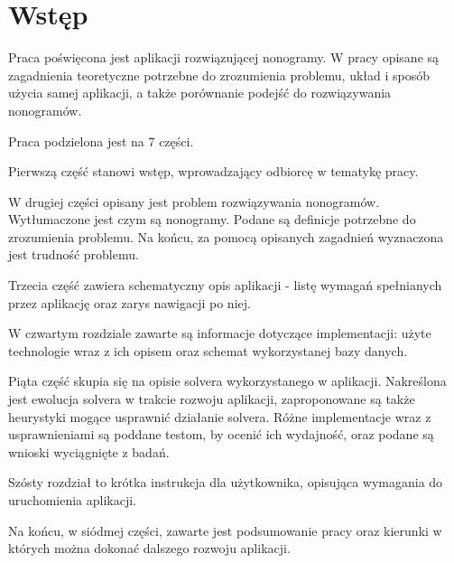 \chapter{Wstęp}
\thispagestyle{chapterBeginStyle}



	Praca poświęcona jest aplikacji rozwiązującej nonogramy. W pracy opisane są zagadnienia
teoretyczne potrzebne do zrozumienia problemu, układ i sposób użycia samej aplikacji, a także
porównanie podejść do rozwiązywania nonogramów.

	Praca podzielona jest na 7 części.

	Pierwszą część stanowi wstęp, wprowadzający odbiorcę w tematykę pracy.

	W drugiej części opisany jest problem rozwiązywania nonogramów. Wytłumaczone jest
czym są nonogramy. Podane są definicje potrzebne do zrozumienia problemu. Na końcu, za pomocą
opisanych zagadnień wyznaczona jest trudność problemu.

	Trzecia część zawiera schematyczny opis aplikacji - listę wymagań spełnianych przez
aplikację oraz zarys nawigacji po niej.

	W czwartym rozdziale zawarte są informacje dotyczące implementacji: użyte technologie wraz
z ich opisem oraz schemat wykorzystanej bazy danych.

	Piąta część skupia się na opisie solvera wykorzystanego w aplikacji. Nakreślona jest ewolucja
solvera w trakcie rozwoju aplikacji, zaproponowane są także heurystyki mogące usprawnić działanie
solvera. Różne implementacje wraz z usprawnieniami są poddane testom, by ocenić ich wydajność,
oraz podane są wnioski wyciągnięte z badań.

	Szósty rozdział to krótka instrukcja dla użytkownika, opisująca wymagania do uruchomienia aplikacji.

	Na końcu, w siódmej części, zawarte jest podsumowanie pracy oraz kierunki w których
można dokonać dalszego rozwoju aplikacji.
